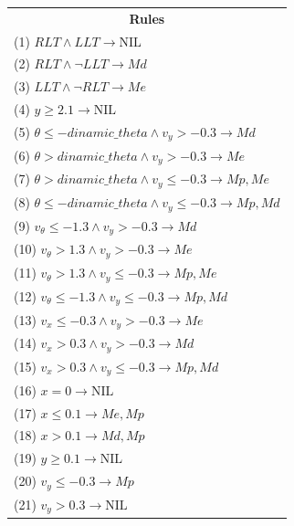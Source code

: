 \documentclass[a4paper, 12pt, fleqn]{report}
\begin{document}
\begin{itemize}
\begin{table}[h!]
    \begin{tabular}{p{16cm}} 
    \multicolumn{1}{c}{\textbf{Rules}} \\     
    (1) $RLT \land LLT \rightarrow \text{NIL}$ \\  
    (2) $RLT \land \neg LLT \rightarrow Md$ \\  
    (3) $LLT \land \neg RLT \rightarrow Me$ \\  
    (4) $y \geq 2.1 \rightarrow \text{NIL}$ \\  
    (5) $\theta \leq -dinamic\_theta \land v_y > -0.3 \rightarrow Md$ \\  
    (6) $\theta > dinamic\_theta \land v_y > -0.3 \rightarrow Me$ \\  
    (7) $\theta > dinamic\_theta \land v_y \leq -0.3 \rightarrow Mp, Me$ \\  
    (8) $\theta \leq -dinamic\_theta \land v_y \leq -0.3 \rightarrow Mp, Md$ \\  
    (9) $v_\theta \leq -1.3 \land v_y > -0.3 \rightarrow Md$ \\  
    (10) $v_\theta > 1.3 \land v_y > -0.3 \rightarrow Me$ \\  
    (11) $v_\theta > 1.3 \land v_y \leq -0.3 \rightarrow Mp, Me$ \\  
    (12) $v_\theta \leq -1.3 \land v_y \leq -0.3 \rightarrow Mp, Md$ \\  
    (13) $v_x \leq -0.3 \land v_y > -0.3 \rightarrow Me$ \\  
    (14) $v_x > 0.3 \land v_y > -0.3 \rightarrow Md$ \\  
    (15) $v_x > 0.3 \land v_y \leq -0.3 \rightarrow Mp, Md$ \\  
    (16) $x = 0 \rightarrow \text{NIL}$ \\  
    (17) $x \leq 0.1 \rightarrow Me, Mp$ \\  
    (18) $x > 0.1 \rightarrow Md, Mp$ \\  
    (19) $y \geq  0.1 \rightarrow \text{NIL}$ \\
    (20) $v_y \leq -0.3 \rightarrow Mp$ \\  
    (21) $v_y > 0.3 \rightarrow \text{NIL}$ \\  
    
    \end{tabular}
\end{table}

\end{itemize}
\end{document}
